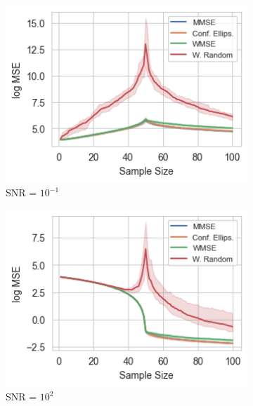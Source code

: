 \begin{figure}%
    \centering
    \begin{subfigure}{0.3\columnwidth}
    \includegraphics[width=\columnwidth]{figures/proj1/plots/LS_MSE/BA_3_500_bandwidth_50_SNRdbs_-10.0_samps_100_MSE_LS.png}
    \caption{SNR = $10^{-1}$}
    \label{BA_MSE_subfiga}
    \end{subfigure}\hfill
    \begin{subfigure}{0.3\columnwidth}
    \includegraphics[width=\columnwidth]{figures/proj1/plots/LS_MSE/BA_3_500_bandwidth_50_SNRdbs_20.0_samps_100_MSE_LS.png}%
    \caption{SNR = $10^{2}$}%
    \label{BA_MSE_subfigb}%
    \end{subfigure}\hfill%
    \begin{subfigure}{0.3\columnwidth}

\end{subfigure}
\end{figure}
